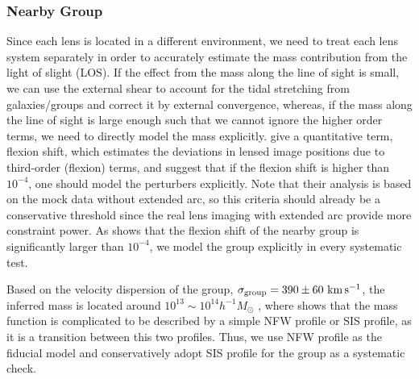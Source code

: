 \documentclass[useAMS,usenatbib]{mnras}
\newcommand\rxj{RXJ\,1131$-$1231}
\newcommand\he{HE\,0435$-$1223}
\def\kms {\rm km\,s^{-1}}
\newcommand{\Ddt}{{D_{\Delta t}}}
\begin{document}
\subsubsection{Nearby Group}
Since each lens is located in a different environment, we need to treat each lens system separately in order to accurately estimate the mass contribution from the light of slight (LOS). 
If the effect from the mass along the line of sight is small, we can use the external shear to account for the tidal stretching from galaxies/groups and correct it by external convergence, whereas, if the mass along the line of sight is large enough such that we cannot ignore the higher order terms, we need to directly model the mass explicitly.
\citet{McCullyEtal14,McCullyEtal17} give a quantitative term, flexion shift, which estimates the deviations in lensed image positions due to third-order (flexion) terms, and suggest that if the flexion shift is higher than $10^{-4}$, one should model the perturbers explicitly. 
Note that their analysis is based on the mock data without extended arc, so this criteria should already be a conservative threshold since the real lens imaging with extended arc provide more constraint power. 
As \citet{McCullyEtal17} shows that the flexion shift of the nearby group is significantly larger than $10^{-4}$, we model the group explicitly in every systematic test. 

Based on the velocity dispersion of the group, $\sigma_{\textrm{group}}=390\pm60~\kms$, the inferred mass is located around $10^{13}\sim10^{14}h^{-1}M_{\odot}$ \citep{WilsonEtal16}, where \citet{Oguri06} shows that the mass function is complicated to be described by a simple NFW profile or SIS profile, as it is a transition between this two profiles. Thus, we use NFW profile as the fiducial model and conservatively adopt SIS profile for the group as a systematic check.
\end{document}
